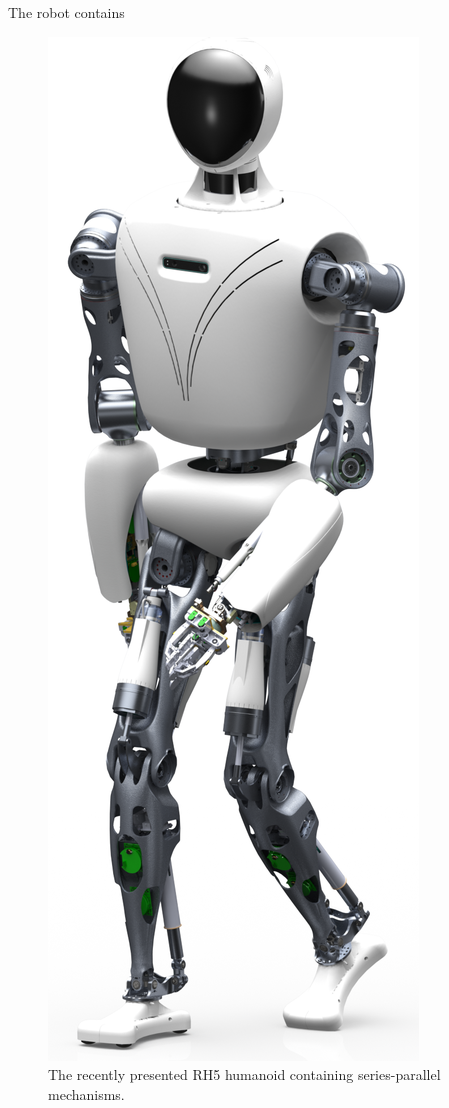 The robot contains   

\begin{figure}[h!]
\centering	
\includegraphics[width=.25\textwidth]{img/rh5_robot.png}
\caption{The recently presented RH5 humanoid containing series-parallel mechanisms.}
\label{fig:rh5}
\end{figure} 



